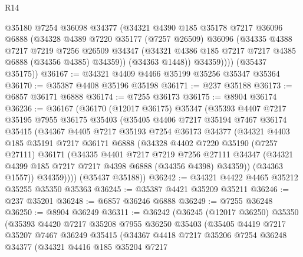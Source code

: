 \begin{lexlean}{R14}
\begin{coremodule}
            @35180
            @7254
            @36098
            @34377
            (@34321
              @4390
              @185
              @35178
              @7217
              @36096
              @6888
              (@34328
                @4389
                @7220
                @35177
                (@7257 @26509)
                @36096
                (@34335
                  @4388
                  @7217
                  @7219
                  @7256
                  @26509
                  @34347
                  (@34321 @4386 @185 @7217 @7217 @4385 @6888 (@34356 @4385) @34359))
                (@34363 @1448))
              @34359))))
      (@35437 @35175))
@36167 := @34321 @4409 @4466 @35199 @35256 @35347 @35364
@36170 := @35387 @4408 @35196 @35198
@36171 := @237 @35188
@36173 := @6857 @36171 @6888
@36174 := @7255 @36173
@36175 := @8904 @36174
@36236 := @36167
    (@36170
      (@12017 @36175)
      @35347
      (@35393
        @4407
        @7217
        @35195
        @7955
        @36175
        @35403
        (@35405
          @4406
          @7217
          @35194
          @7467
          @36174
          @35415
          (@34367
            @4405
            @7217
            @35193
            @7254
            @36173
            @34377
            (@34321
              @4403
              @185
              @35191
              @7217
              @36171
              @6888
              (@34328
                @4402
                @7220
                @35190
                (@7257 @27111)
                @36171
                (@34335
                  @4401
                  @7217
                  @7219
                  @7256
                  @27111
                  @34347
                  (@34321 @4399 @185 @7217 @7217 @4398 @6888 (@34356 @4398) @34359))
                (@34363 @1557))
              @34359))))
      (@35437 @35188))
@36242 := @34321 @4422 @4465 @35212 @35255 @35350 @35363
@36245 := @35387 @4421 @35209 @35211
@36246 := @237 @35201
@36248 := @6857 @36246 @6888
@36249 := @7255 @36248
@36250 := @8904 @36249
@36311 := @36242
    (@36245
      (@12017 @36250)
      @35350
      (@35393
        @4420
        @7217
        @35208
        @7955
        @36250
        @35403
        (@35405
          @4419
          @7217
          @35207
          @7467
          @36249
          @35415
          (@34367
            @4418
            @7217
            @35206
            @7254
            @36248
            @34377
            (@34321
              @4416
              @185
              @35204
              @7217

\end{coremodule}
\end{lexlean}
